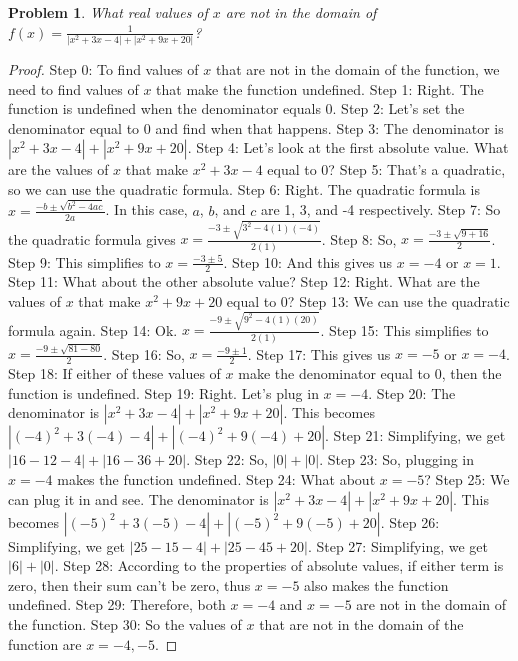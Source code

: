 \documentclass{article}
\newtheorem{theorem}{Problem}
\begin{document}
\begin{theorem}
What real values of $x$ are not in the domain of\n\n$f(x)=\frac{1}{|x^2+3x-4|+|x^2+9x+20|}$?
\end{theorem}

\begin{proof}
Step 0: To find values of $x$ that are not in the domain of the function, we need to find values of $x$ that make the function undefined.
Step 1: Right. The function is undefined when the denominator equals 0.
Step 2: Let's set the denominator equal to 0 and find when that happens.
Step 3: The denominator is $|x^2+3x-4|+|x^2+9x+20|$.
Step 4: Let's look at the first absolute value. What are the values of $x$ that make $x^2+3x-4$ equal to 0?
Step 5: That's a quadratic, so we can use the quadratic formula.
Step 6: Right. The quadratic formula is $x=\frac{-b\pm\sqrt{b^2-4ac}}{2a}$. In this case, $a$, $b$, and $c$ are 1, 3, and -4 respectively.
Step 7: So the quadratic formula gives $x=\frac{-3\pm\sqrt{3^2-4(1)(-4)}}{2(1)}$.
Step 8: So, $x=\frac{-3\pm\sqrt{9+16}}{2}$.
Step 9: This simplifies to $x=\frac{-3\pm5}{2}$.
Step 10: And this gives us $x=-4$ or $x=1$.
Step 11: What about the other absolute value?
Step 12: Right. What are the values of $x$ that make $x^2+9x+20$ equal to 0?
Step 13: We can use the quadratic formula again.
Step 14: Ok. $x=\frac{-9\pm\sqrt{9^2-4(1)(20)}}{2(1)}$.
Step 15: This simplifies to $x=\frac{-9\pm\sqrt{81-80}}{2}$.
Step 16: So, $x=\frac{-9\pm1}{2}$.
Step 17: This gives us $x=-5$ or $x=-4$.
Step 18: If either of these values of $x$ make the denominator equal to 0, then the function is undefined.
Step 19: Right. Let's plug in $x=-4$.
Step 20: The denominator is $|x^2+3x-4|+|x^2+9x+20|$. This becomes $|(-4)^2+3(-4)-4|+|(-4)^2+9(-4)+20|$.
Step 21: Simplifying, we get $|16 -12 -4|+|16 -36 +20|$.
Step 22: So, $|0|+|0|$.
Step 23: So, plugging in $x=-4$ makes the function undefined.
Step 24: What about $x=-5$?
Step 25: We can plug it in and see. The denominator is $|x^2+3x-4|+|x^2+9x+20|$. This becomes $|(-5)^2+3(-5)-4|+|(-5)^2+9(-5)+20|$.
Step 26: Simplifying, we get $|25-15-4|+|25-45+20|$.
Step 27: Simplifying, we get $|6|+|0|$.
Step 28: According to the properties of absolute values, if either term is zero, then their sum can't be zero, thus $x=-5$ also makes the function undefined.
Step 29: Therefore, both $x=-4$ and $x=-5$ are not in the domain of the function.
Step 30: So the values of $x$ that are not in the domain of the function are $x=-4, -5$.
\end{proof}
\end{document}
